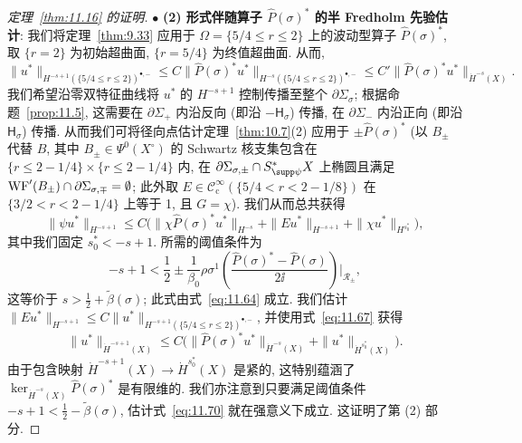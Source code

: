 \begin{proof}[定理~\ref{thm:11.16} 的证明]
\noindent $\bullet$ \textbf{(2) 形式伴随算子 $\widehat{P}(\sigma)^*$ 的半 Fredholm 先验估计}:
我们将定理~\ref{thm:9.33} 应用于 $\Omega = \{5/4 \le r \le 2\}$ 上的波动型算子 $\widehat{P}(\sigma)^*$, 取 $\{r = 2\}$ 为初始超曲面, $\{r = 5/4\}$ 为终值超曲面. 从而,
\begin{equation}\label{eq:11.67}
    \|u^*\|_{H^{-s+1}(\{5/4 \le r \le 2\})^{\bullet, -}} \le C \|\widehat{P}(\sigma)^* u^*\|_{H^{-s}(\{5/4 \le r \le 2\})^{\bullet, -}} \le C' \|\widehat{P}(\sigma)^* u^*\|_{\dot H^{-s}(X)}.
\end{equation}
我们希望沿零双特征曲线将 $u^*$ 的 $H^{-s+1}$ 控制传播至整个 $\partial\Sigma_\sigma$; 根据命题~\ref{prop:11.5}, 这需要在 $\partial\Sigma_+$ 内沿反向 (即沿 $-\mathsf{H}_\sigma$) 传播, 在 $\partial\Sigma_-$ 内沿正向 (即沿 $\mathsf{H}_\sigma$) 传播. 从而我们可将径向点估计定理~\ref{thm:10.7}(2) 应用于 $\pm \widehat{P}(\sigma)^*$ (以 $B_\pm$ 代替 $B$, 其中 $B_\pm \in \Psi^0(X^\circ)$ 的 Schwartz 核支集包含在 $\{r \le 2 - 1/4\} \times \{r \le 2 - 1/4\}$ 内, 在 $\partial\Sigma_{\sigma, \pm} \cap S_{\supp\psi}^* X$ 上椭圆且满足 $\operatorname{WF}'(B_\pm) \cap \partial\Sigma_{\sigma, \mp} = \emptyset$; 此外取 $E \in \mathcal{C}_{\mathrm{c}}^\infty(\{5/4 < r < 2 - 1/8\})$ 在 $\{3/2 < r < 2 - 1/4\}$ 上等于 1, 且 $G = \chi$). 我们从而总共获得
\begin{equation}\label{eq:11.68}
    \|\psi u^*\|_{H^{-s+1}} \le C \big( \|\chi \widehat{P}(\sigma)^* u^*\|_{H^{-s}} + \|E u^*\|_{H^{-s+1}} + \|\chi u^*\|_{H^{s_0^*}} \big),
\end{equation}
其中我们固定 $s_0^* < -s + 1$. 所需的阈值条件为
\begin{equation}\label{eq:11.69}
    -s + 1 < \frac{1}{2} \pm \frac{1}{\beta_0} \rho \sigma^1\left( \frac{\widehat{P}(\sigma)^* - \widehat{P}(\sigma)}{2\ii} \right)\Big|_{\mathcal{R}_\pm},
\end{equation}
这等价于 $s > \frac{1}{2} + \tilde\beta(\sigma)$; 此式由式~\eqref{eq:11.64} 成立. 我们估计 $\|E u^*\|_{H^{-s+1}} \le C \|u^*\|_{H^{-s+1}(\{5/4 \le r \le 2\})^{\bullet, -}}$, 并使用式~\eqref{eq:11.67} 获得
\begin{equation}\label{eq:11.70}
    \|u^*\|_{\dot H^{-s+1}(X)} \le C \big( \|\widehat{P}(\sigma)^* u^*\|_{\dot H^{-s}(X)} + \|u^*\|_{\dot H^{s_0^*}(X)} \big).
\end{equation}
由于包含映射 $\dot H^{-s+1}(X) \to \dot H^{s_0^*}(X)$ 是紧的, 这特别蕴涵了 $\ker_{\dot H^{-s}(X)} \widehat{P}(\sigma)^*$ 是有限维的. 我们亦注意到只要满足阈值条件 $-s + 1 < \frac{1}{2} - \tilde\beta(\sigma)$, 估计式~\eqref{eq:11.70} 就在强意义下成立. 这证明了第 (2) 部分.


\end{proof}
